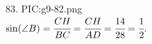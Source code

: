 83. {{PIC:g9-82.png}}\\
$\sin(\angle B)=\cfrac{CH}{BC}=\cfrac{CH}{AD}=\cfrac{14}{28}=\cfrac{1}{2}.$\\
